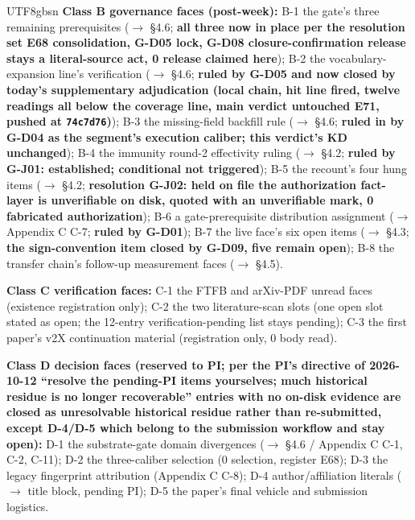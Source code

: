 \documentclass[11pt,letterpaper]{article}
\begin{document}
\begin{CJK}{UTF8}{gbsn}
\textbf{Class B \textemdash{} governance faces (post-week):} B-1 the gate's three remaining prerequisites (\ensuremath{\to} \S{}4.6; \textbf{all three now in place per the resolution set \textemdash{} E68 consolidation, G-D05 lock, G-D08 closure-confirmation \textemdash{} release stays a literal-source act, 0 release claimed here}); B-2 the vocabulary-expansion line's verification (\ensuremath{\to} \S{}4.6; \textbf{ruled by G-D05 and now closed by today's supplementary adjudication (local chain, hit line fired, twelve readings all below the coverage line, main verdict untouched \textemdash{} E71, pushed at \texttt{74c7d76})}); B-3 the missing-field backfill rule (\ensuremath{\to} \S{}4.6; \textbf{ruled in by G-D04 as the segment's execution caliber; this verdict's KD unchanged}); B-4 the immunity round-2 effectivity ruling (\ensuremath{\to} \S{}4.2; \textbf{ruled by G-J01: established; conditional not triggered}); B-5 the recount's four hung items (\ensuremath{\to} \S{}4.2; \textbf{resolution G-J02: held on file \textemdash{} the authorization fact-layer is unverifiable on disk, quoted with an unverifiable mark, 0 fabricated authorization}); B-6 a gate-prerequisite distribution assignment (\ensuremath{\to} Appendix C C-7; \textbf{ruled by G-D01}); B-7 the live face's six open items (\ensuremath{\to} \S{}4.3; \textbf{the sign-convention item closed by G-D09, five remain open}); B-8 the transfer chain's follow-up measurement faces (\ensuremath{\to} \S{}4.5).

\textbf{Class C \textemdash{} verification faces:} C-1 the FTFB and arXiv-PDF unread faces (existence registration only); C-2 the two literature-scan slots (one open slot stated as open; the 12-entry verification-pending list stays pending); C-3 the first paper's v2X continuation material (registration only, 0 body read).

\textbf{Class D \textemdash{} decision faces (reserved to PI; per the PI's directive of 2026-10-12 \textemdash{} ``resolve the pending-PI items yourselves; much historical residue is no longer recoverable'' \textemdash{} entries with no on-disk evidence are closed as unresolvable historical residue rather than re-submitted, except D-4/D-5 which belong to the submission workflow and stay open):} D-1 the substrate-gate domain divergences (\ensuremath{\to} \S{}4.6 / Appendix C C-1, C-2, C-11); D-2 the three-caliber selection (0 selection, register E68); D-3 the legacy fingerprint attribution (Appendix C C-8); D-4 author/affiliation literals (\ensuremath{\to} title block, pending PI); D-5 the paper's final vehicle and submission logistics.


\end{CJK}
\end{document}
